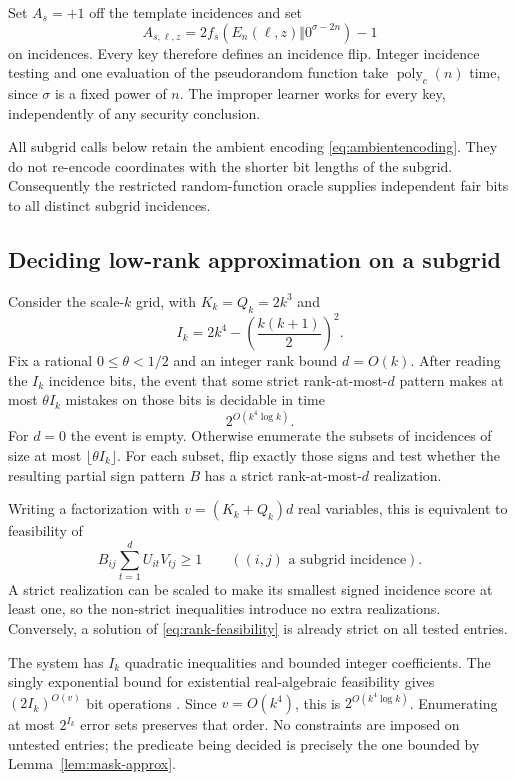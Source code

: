\documentclass[11pt,letterpaper,pmlr,twoside]{jmlr}
\newcommand{\poly}{\operatorname{poly}}
\newcommand{\floor}[1]{\lfloor #1\rfloor}
\begin{document}
Set $A_s=+1$ off the template incidences and set
\[
 A_{s,\ell,z}=2f_s(E_n(\ell,z)\Vert0^{\sigma-2n})-1
\]
on incidences. Every key therefore defines an incidence flip. Integer incidence testing and one evaluation of the pseudorandom function take $\poly_c(n)$ time, since $\sigma$ is a fixed power of $n$. The improper learner works for every key, independently of any security conclusion.

All subgrid calls below retain the ambient encoding \eqref{eq:ambientencoding}. They do not re-encode coordinates with the shorter bit lengths of the subgrid. Consequently the restricted random-function oracle supplies independent fair bits to all distinct subgrid incidences.

\subsection{Deciding low-rank approximation on a subgrid}
Consider the scale-$k$ grid, with $K_k=Q_k=2k^3$ and
\[
 I_k=2k^4-\left(\frac{k(k+1)}2\right)^2.
\]
Fix a rational $0\le\theta<1/2$ and an integer rank bound $d=O(k)$. After reading the $I_k$ incidence bits, the event that some strict rank-at-most-$d$ pattern makes at most $\theta I_k$ mistakes on those bits is decidable in time
\begin{equation}
 2^{O(k^4\log k)}.
\label{eq:decisiontime}
\end{equation}
For $d=0$ the event is empty. Otherwise enumerate the subsets of incidences of size at most $\floor{\theta I_k}$. For each subset, flip exactly those signs and test whether the resulting partial sign pattern $B$ has a strict rank-at-most-$d$ realization.

Writing a factorization with $v=(K_k+Q_k)d$ real variables, this is equivalent to feasibility of
\begin{equation}
 B_{ij}\sum_{t=1}^{d}U_{it}V_{tj}\ge1
 \qquad((i,j)\text{ a subgrid incidence}).
\label{eq:rank-feasibility}
\end{equation}
A strict realization can be scaled to make its smallest signed incidence score at least one, so the non-strict inequalities introduce no extra realizations. Conversely, a solution of \eqref{eq:rank-feasibility} is already strict on all tested entries.

The system has $I_k$ quadratic inequalities and bounded integer coefficients. The singly exponential bound for existential real-algebraic feasibility gives $(2I_k)^{O(v)}$ bit operations \citep{Renegar92a,Renegar92b,Renegar92c}. Since $v=O(k^4)$, this is $2^{O(k^4\log k)}$. Enumerating at most $2^{I_k}$ error sets preserves that order. No constraints are imposed on untested entries; the predicate being decided is precisely the one bounded by Lemma~\ref{lem:mask-approx}.
\end{document}
